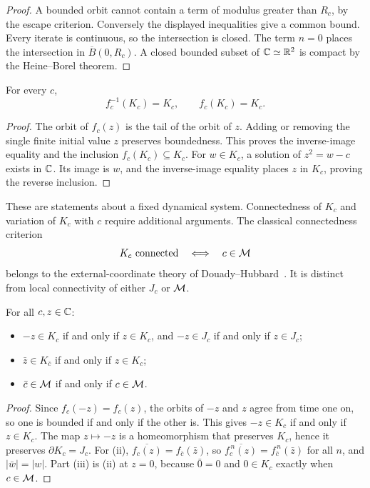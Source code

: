 \begin{proof}
A bounded orbit cannot contain a term of modulus greater than $R_c$,
by the escape criterion.  Conversely the displayed inequalities give
a common bound.  Every iterate is continuous, so the intersection is
closed.  The term $n=0$ places the intersection in
$\overline B(0,R_c)$.  A closed bounded subset of $\mathbb C\simeq\mathbb R^2$ is
compact by the Heine--Borel theorem.
\end{proof}

\begin{proposition}
\label{prop:filled-julia-invariant}
For every $c$,
\[
 f_c^{-1}(K_c)=K_c,\qquad f_c(K_c)=K_c.
\]
\end{proposition}

\begin{proof}
The orbit of $f_c(z)$ is the tail of the orbit of $z$.  Adding or removing
the single finite initial value $z$ preserves boundedness.  This proves
the inverse-image equality and the inclusion $f_c(K_c)\subseteq K_c$.
For $w\in K_c$, a solution of $z^2=w-c$ exists in $\mathbb C$.  Its image is
$w$, and the inverse-image equality places $z$ in $K_c$, proving the
reverse inclusion.
\end{proof}

These are statements about a fixed dynamical system.  Connectedness of
$K_c$ and variation of $K_c$ with $c$ require additional arguments.
The classical connectedness criterion
\[
 K_c\text{ connected}\quad\Longleftrightarrow\quad c\in\mathcal M
\]
belongs to the external-coordinate theory of
Douady--Hubbard~\cite{DH}.  It is distinct from local connectivity of
either $J_c$ or $\mathcal M$.

\begin{proposition}
\label{prop:elementary-symmetries}
For all $c,z\in\mathbb C$:
\begin{itemize}
\item[(i)] $-z\in K_c$ if and only if $z\in K_c$, and $-z\in J_c$ if and only if $z\in J_c$;
\item[(ii)] $\bar z\in K_{\bar c}$ if and only if $z\in K_c$;
\item[(iii)] $\bar c\in\mathcal M$ if and only if $c\in\mathcal M$.
\end{itemize}
\end{proposition}

\begin{proof}
Since $f_c(-z)=f_c(z)$, the orbits of $-z$ and $z$ agree from time one on, so one is bounded if and only if the other is.
This gives $-z\in K_c$ if and only if $z\in K_c$.  The map $z\mapsto -z$ is a homeomorphism that preserves $K_c$, hence it
preserves $\partial K_c=J_c$.  For (ii), $\overline{f_c(z)}=f_{\bar c}(\bar z)$, so $\overline{f_c^{\,n}(z)}=f_{\bar c}^{\,n}(\bar z)$
for all $n$, and $|\bar w|=|w|$.  Part (iii) is (ii) at $z=0$, because $\bar 0=0$ and $0\in K_c$ exactly when $c\in\mathcal M$.
\end{proof}

